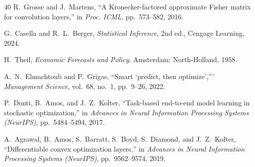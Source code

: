 \documentclass[journal]{IEEEtran}
\begin{document}
\begin{thebibliography}{40}
R.~Grosse and J.~Martens, ``A Kronecker-factored approximate Fisher
matrix for convolution layers,'' in \emph{Proc. ICML}, pp.~573--582,
2016.

G.~Casella and R.~L.~Berger, \emph{Statistical Inference}, 2nd ed.,
Cengage Learning, 2024.

H.~Theil, \emph{Economic Forecasts and Policy}. Amsterdam: North-Holland,
1958.

A.~N.~Elmachtoub and P.~Grigas, ``Smart `predict, then optimize','''
\emph{Management Science}, vol.~68, no.~1, pp.~9--26, 2022.

P.~Donti, B.~Amos, and J.~Z.~Kolter, ``Task-based end-to-end model
learning in stochastic optimization,'' in \emph{Advances in Neural
Information Processing Systems (NeurIPS)}, pp.~5484--5494, 2017.

A.~Agrawal, B.~Amos, S.~Barratt, S.~Boyd, S.~Diamond, and J.~Z.~Kolter,
``Differentiable convex optimization layers,'' in \emph{Advances in
Neural Information Processing Systems (NeurIPS)}, pp.~9562--9574, 2019.

\end{thebibliography}
\end{document}
